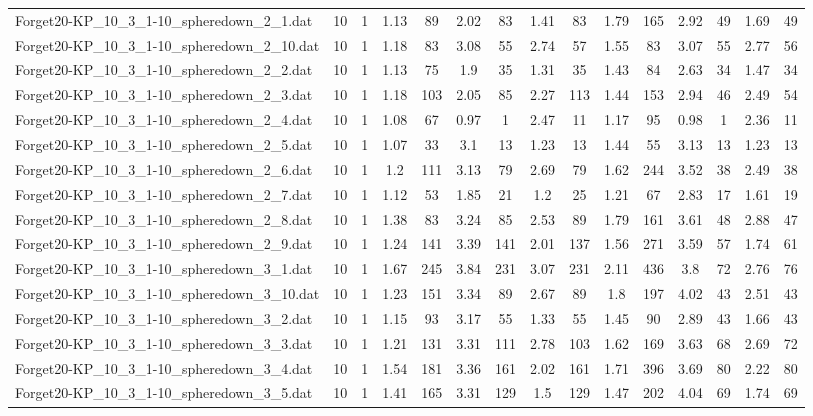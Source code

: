 \begin{table}[!ht]
{\begin{tabular}{lcccccccccccccc}
Forget20-KP\_10\_3\_1-10\_spheredown\_2\_1.dat & 10 & 1 & 1.13 & 89 & 2.02 & 83 & 1.41 & 83 & 1.79 & 165 & 2.92 & 49 & 1.69 & 49 \\
Forget20-KP\_10\_3\_1-10\_spheredown\_2\_10.dat & 10 & 1 & 1.18 & 83 & 3.08 & 55 & 2.74 & 57 & 1.55 & 83 & 3.07 & 55 & 2.77 & 56 \\
Forget20-KP\_10\_3\_1-10\_spheredown\_2\_2.dat & 10 & 1 & 1.13 & 75 & 1.9 & 35 & 1.31 & 35 & 1.43 & 84 & 2.63 & 34 & 1.47 & 34 \\
Forget20-KP\_10\_3\_1-10\_spheredown\_2\_3.dat & 10 & 1 & 1.18 & 103 & 2.05 & 85 & 2.27 & 113 & 1.44 & 153 & 2.94 & 46 & 2.49 & 54 \\
Forget20-KP\_10\_3\_1-10\_spheredown\_2\_4.dat & 10 & 1 & 1.08 & 67 & 0.97 & 1 & 2.47 & 11 & 1.17 & 95 & 0.98 & 1 & 2.36 & 11 \\
Forget20-KP\_10\_3\_1-10\_spheredown\_2\_5.dat & 10 & 1 & 1.07 & 33 & 3.1 & 13 & 1.23 & 13 & 1.44 & 55 & 3.13 & 13 & 1.23 & 13 \\
Forget20-KP\_10\_3\_1-10\_spheredown\_2\_6.dat & 10 & 1 & 1.2 & 111 & 3.13 & 79 & 2.69 & 79 & 1.62 & 244 & 3.52 & 38 & 2.49 & 38 \\
Forget20-KP\_10\_3\_1-10\_spheredown\_2\_7.dat & 10 & 1 & 1.12 & 53 & 1.85 & 21 & 1.2 & 25 & 1.21 & 67 & 2.83 & 17 & 1.61 & 19 \\
Forget20-KP\_10\_3\_1-10\_spheredown\_2\_8.dat & 10 & 1 & 1.38 & 83 & 3.24 & 85 & 2.53 & 89 & 1.79 & 161 & 3.61 & 48 & 2.88 & 47 \\
Forget20-KP\_10\_3\_1-10\_spheredown\_2\_9.dat & 10 & 1 & 1.24 & 141 & 3.39 & 141 & 2.01 & 137 & 1.56 & 271 & 3.59 & 57 & 1.74 & 61 \\
Forget20-KP\_10\_3\_1-10\_spheredown\_3\_1.dat & 10 & 1 & 1.67 & 245 & 3.84 & 231 & 3.07 & 231 & 2.11 & 436 & 3.8 & 72 & 2.76 & 76 \\
Forget20-KP\_10\_3\_1-10\_spheredown\_3\_10.dat & 10 & 1 & 1.23 & 151 & 3.34 & 89 & 2.67 & 89 & 1.8 & 197 & 4.02 & 43 & 2.51 & 43 \\
Forget20-KP\_10\_3\_1-10\_spheredown\_3\_2.dat & 10 & 1 & 1.15 & 93 & 3.17 & 55 & 1.33 & 55 & 1.45 & 90 & 2.89 & 43 & 1.66 & 43 \\
Forget20-KP\_10\_3\_1-10\_spheredown\_3\_3.dat & 10 & 1 & 1.21 & 131 & 3.31 & 111 & 2.78 & 103 & 1.62 & 169 & 3.63 & 68 & 2.69 & 72 \\
Forget20-KP\_10\_3\_1-10\_spheredown\_3\_4.dat & 10 & 1 & 1.54 & 181 & 3.36 & 161 & 2.02 & 161 & 1.71 & 396 & 3.69 & 80 & 2.22 & 80 \\
Forget20-KP\_10\_3\_1-10\_spheredown\_3\_5.dat & 10 & 1 & 1.41 & 165 & 3.31 & 129 & 1.5 & 129 & 1.47 & 202 & 4.04 & 69 & 1.74 & 69 \\

\end{tabular}}
\end{table}

